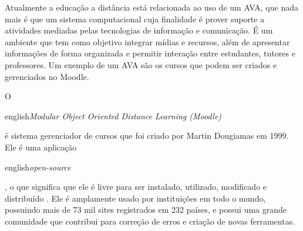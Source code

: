 \documentclass[
	12pt,				%
	openright,			%
	oneside,			%
	a4paper,			%
	english,			%
	french,				%
	spanish,			%
	brazil				%
	]{abntex2}
\begin{document}
Atualmente a educação a distância está relacionada ao uso de um AVA, que nada mais é que um sistema computacional cuja finalidade é prover suporte a atividades mediadas pelas tecnologias de informação e comunicação\cite{Almeida2010}. É um ambiente que tem como objetivo integrar mídias e recursos, além de apresentar informações de forma organizada e permitir interação entre estudantes, tutores e professores\cite{Franciscato2008}. Um exemplo de um AVA são os cursos que podem ser criados e gerenciados no Moodle.
   
O \begin{otherlanguage*}{english}\textit{Modular Object Oriented Distance Learning (Moodle)}\end{otherlanguage*} é sistema gerenciador de cursos que foi criado por Martin Dougiamas em 1999. Ele é uma aplicação \begin{otherlanguage*}{english}\textit{open-source}\end{otherlanguage*}, o que significa que ele é livre para ser instalado, utilizado, modificado e distribuído \cite{Dougiamas2003}. Ele é amplamente usado por instituições em todo o mundo, possuindo mais de 73 mil sites registrados em 232 países\cite{MoodleStat2016}, e possui uma grande comunidade que contribui para correção de erros e criação de novas ferramentas.

\begin{table}[htb]
\end{table}
\end{document}
